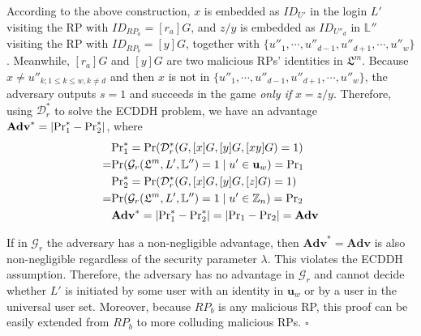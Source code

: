 According to the above construction, %
$x$ is embedded as $ID_{U'}$ in the login $L'$ visiting the RP with $ID_{RP_{a}} = [r_{a}]G$,
and $z/y$ is embedded as $ID_{U''_d}$ in $\mathbb{L}''$ visiting the RP with $ID_{RP_{b}}=[y]G$,
together with $\{u''_1, \cdots, u''_{d-1}, u''_{d+1}, \cdots, u''_w\}$.
Meanwhile, $[r_{a}]G$ and $[y]G$ are two malicious RPs' identities in $\mathfrak{L}^m$.
Because $x \neq u''_{k; 1\leq k \leq w, k \neq d}$ and then $x$ is not in $\{u''_1, \cdots, u''_{d-1}, u''_{d+1}, \cdots, u''_w\}$, the adversary outputs $s=1$ and succeeds in the game \emph{only if} $x = z/y$.
 Therefore, using $\mathcal{D}^*_r$ to solve the ECDDH problem, we have an advantage $\mathbf{Adv}^*=|{\rm Pr}^*_1 - {\rm Pr}^*_2|$, where
\begin{align*}
&{\rm Pr}^*_1 =  {\rm Pr}(\mathcal{D}^*_r(G, [x]G, [y]G, [xy]G)=1) \\
=&{\rm Pr}(\mathcal{G}_r(\mathfrak{L}^m, L', \mathbb{L}'')=1 \; | \; u' \in \mathbf{u}_w) = {\rm Pr}_1 \\
&{\rm Pr}^*_2= {\rm Pr}(\mathcal{D}^*_r(G, [x]G, [y]G, [z]G)=1) \\
=&{\rm Pr}(\mathcal{G}_r(\mathfrak{L}^m, L', \mathbb{L}'')=1 \; | \; u' \in \mathbb{Z}_n) = {\rm Pr}_2 \\
&\mathbf{Adv}^*=|{\rm Pr}^*_1-{\rm Pr}^*_2|=|{\rm Pr}_1-{\rm Pr}_2|={\mathbf{Adv}}
\end{align*}

If in $\mathcal{G}_r$ the adversary has a non-negligible advantage, then $\mathbf{Adv}^*={\mathbf{Adv}}$ is also non-negligible regardless of the security parameter $\lambda$. This violates the ECDDH assumption. Therefore, the adversary has no advantage in $\mathcal{G}_r$ and cannot decide whether $L'$ is initiated by some user with an identity in $\mathbf{u}_w$ or by a user in the universal user set.
Moreover, because $RP_b$ is any malicious RP, this proof can be easily extended from $RP_b$ to more colluding malicious RPs.
\hfill $\square$

\oldc

